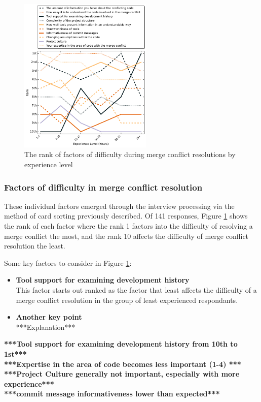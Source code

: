 \documentclass[conference]{IEEEtran}
\begin{document}
\begin{figure}[!t]
\centering
\includegraphics[width=2.5in]{ExpVsRankResDiff.pdf}
\caption{The rank of factors of difficulty during merge conflict resolutions by experience level}
\label{res_diff_rank}
\end{figure}

\subsubsection{Factors of difficulty in merge conflict resolution}

These individual factors emerged through the interview processing via the method of card sorting previously described. Of 141 responses, Figure \ref{res_diff_rank} shows the rank of each factor where the rank 1 factors into the difficulty of resolving a merge conflict the most, and the rank 10 affects the difficulty of merge conflict resolution the least.

Some key factors to consider in Figure \ref{res_diff_rank}:
\begin{itemize}
\item \textbf{Tool support for examining development history}\\
This factor starts out ranked as the factor that least affects the difficulty of a merge conflict resolution in the group of least experienced respondants.
\item \textbf{Another key point}\\
***Explanation*** 
\end{itemize}

\textbf{***Tool support for examining development history from 10th to 1st***}\\
\textbf{***Expertise in the area of code becomes less important (1-4) ***}\\
\textbf{***Project Culture generally not important, especially with more experience***}\\
\textbf{***commit message informativeness lower than expected***}\\
\end{document}
